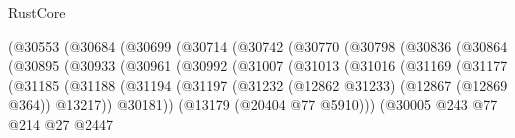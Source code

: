 \begin{lexlean}{RustCore}
\begin{coremodule}
                                    (@30553
                                      (@30684
                                        (@30699
                                          (@30714
                                            (@30742
                                              (@30770
                                                (@30798
                                                  (@30836
                                                    (@30864
                                                      (@30895
                                                        (@30933
                                                          (@30961
                                                            (@30992
                                                              (@31007
                                                                (@31013
                                                                  (@31016
                                                                    (@31169
                                                                      (@31177
                                                                        (@31185
                                                                          (@31188
                                                                            (@31194
                                                                              (@31197
                                                                                (@31232
                                                                                  (@12862 @31233)
                                                                                  (@12867
                                                                                    (@12869 @364))
                                                                                  @13217))
                                                                              @30181))
                                                                          (@13179
                                                                            (@20404 @77 @5910)))
                                                                        (@30005
                                                                          @243
                                                                          @77
                                                                          @214
                                                                          @27
                                                                          @2447

\end{coremodule}
\end{lexlean}
